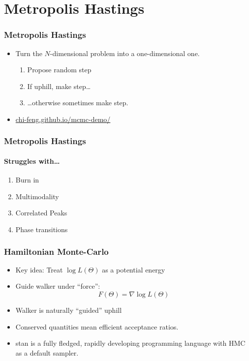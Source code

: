 \documentclass[%
]{beamer}
\begin{document}
\section{Metropolis Hastings}


\begin{frame}
  \frametitle{Metropolis Hastings} 
  \begin{itemize}
      
    \item Turn the $N$-dimensional problem into a one-dimensional one.
      \begin{enumerate}
        \item Propose random step
        \item If uphill, make step\ldots
          
        \item \ldots otherwise sometimes make step. 
      \end{enumerate}
    \item \url{chi-feng.github.io/mcmc-demo/}
  \end{itemize}
\end{frame}


\begin{frame}
  \frametitle{Metropolis Hastings} 
  \framesubtitle{Struggles with\ldots}
  \pause
  \begin{enumerate}
      \item Burn in
      \item Multimodality
      \item Correlated Peaks
      \item Phase transitions
  \end{enumerate}
\end{frame}

\begin{frame}
  \frametitle{Hamiltonian Monte-Carlo} 
  \begin{itemize}
      \item Key idea: Treat $\log L(\Theta)$ as a potential energy
      \item Guide walker under ``force'': \[F(\Theta) =\nabla \log L(\Theta)\]
      \item Walker is naturally ``guided'' uphill
      \item Conserved quantities mean efficient acceptance ratios.
      \item stan is a fully fledged, rapidly developing programming language with HMC as a default sampler.
  \end{itemize}
\end{frame}
\end{document}
